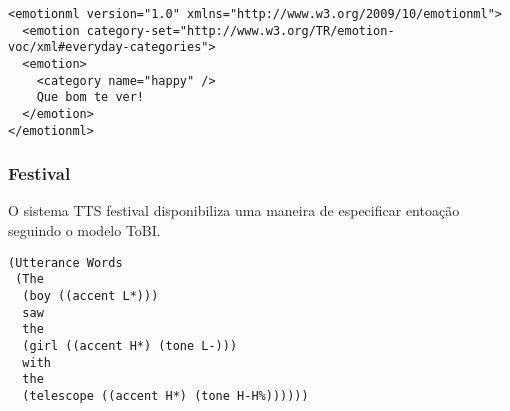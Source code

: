 \begin{lstlisting}[caption=Exemplo de texto anotado com EmotionML]
<emotionml version="1.0" xmlns="http://www.w3.org/2009/10/emotionml">
  <emotion category-set="http://www.w3.org/TR/emotion-voc/xml#everyday-categories">
  <emotion>
    <category name="happy" />
    Que bom te ver!
  </emotion>
</emotionml>
\end{lstlisting}


\subsubsection{Festival}
O sistema TTS festival disponibiliza uma maneira de especificar entoação
seguindo o modelo ToBI.

\begin{lstlisting}[caption=Anotações no modelo ToBI para o sistema TTS Festival]
(Utterance Words 
 (The
  (boy ((accent L*)))
  saw
  the
  (girl ((accent H*) (tone L-)))
  with 
  the
  (telescope ((accent H*) (tone H-H%))))))
\end{lstlisting}